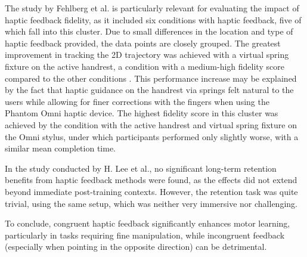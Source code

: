 The study by Fehlberg et al. is particularly relevant for evaluating the impact of haptic feedback fidelity, as it included six conditions with haptic feedback, five of which fall into this cluster. Due to small differences in the location and type of haptic feedback provided, the data points are closely grouped. The greatest improvement in tracking the 2D trajectory was achieved with a virtual spring fixture on the active handrest, a condition with a medium-high fidelity score compared to the other conditions \cite{Fehlberg2012}. This performance increase may be explained by the fact that haptic guidance on the handrest via springs felt natural to the users while allowing for finer corrections with the fingers when using the Phantom Omni haptic device. The highest fidelity score in this cluster was achieved by the condition with the active handrest and virtual spring fixture on the Omni stylus, under which participants performed only slightly worse, with a similar mean completion time.

In the study conducted by H. Lee et al., no significant long-term retention benefits from haptic feedback methods were found, as the effects did not extend beyond immediate post-training contexts. However, the retention task was quite trivial, using the same setup, which was neither very immersive nor challenging.


To conclude, congruent haptic feedback significantly enhances motor learning, particularly in tasks requiring fine manipulation, while incongruent feedback (especially when pointing in the opposite direction) can be detrimental. 
\paragraph{}

\paragraph{}




